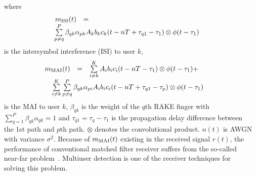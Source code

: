 \documentclass[a4paper,10pt,fleqn, twocolumn]{IEEETran}
\begin{document}
\noindent where
\begin{equation} \hspace{-0.05in}
\begin{array}{rcl}
 m_{\rm ISI}(t)&=&\\
 &&\hspace{-0.83in}\sum\limits^{P}_{p\neq
q}\beta_{qk} \alpha_{pk}A_kb_kc_k(t-nT+\tau_{q1}-\tau_1)\otimes
\phi(t-\tau_1)
\end{array}
\end{equation}
\noindent is the intersymbol interference (ISI) to user $k$,
\begin{equation} \hspace{-0.17in}
\begin{array}{rcl}
m_{\rm MAI}(t)&=&\sum\limits_{i\neq
 k}^{K}A_ib_ic_i(t-nT-\tau_1)\otimes\phi(t-\tau_1)+\\
 &&\hspace{-0.75in}\sum\limits_{i\neq
 k}^{K}\sum\limits^{P}_{p\neq
q}\beta_{qk}
\alpha_{pi}A_ib_ic_i(t-nT+\tau_{q1}-\tau_p)\otimes\phi(t-\tau_1)
\end{array}
\end{equation}
\noindent is the MAI to user $k$, $\beta_{qk}$ is the weight of
the $q$th RAKE finger with
$\sum\limits_{q=1}^{P}\beta_{qk}\alpha_{qk}=1$ and $\tau_{q1} =
\tau_{q}-\tau_1$ is the propagation delay difference between the
$1$st path and $p$th path. $\otimes$ denotes the convolutional
product. $n(t)$ is AWGN with variance $\sigma^2$. Because of
$m_{\rm MAI}(t)$ existing in the received signal $r(t)$, the
performance of conventional matched filter receiver suffers from
the so-called near-far problem~\cite{Verd98}. Multiuser detection
is one of the receiver techniques for solving this problem.
\end{document}

